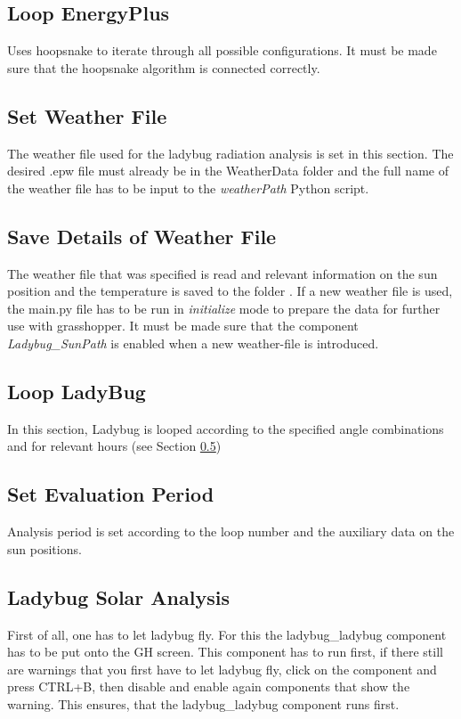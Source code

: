 	\subsection{Loop EnergyPlus}
	Uses hoopsnake to iterate through all possible configurations. It must be made sure that the hoopsnake algorithm is connected correctly.

	\subsection{Set Weather File}
	The weather file used for the ladybug radiation analysis is set in this section. The desired .epw file must already be in the WeatherData folder and the full name of the weather file has to be input to the \emph{weatherPath} Python script. 

	\subsection{Save Details of Weather File}
	The weather file that was specified is read and relevant information on the sun position and the temperature is saved to the folder . If a new weather file is used, the main.py file has to be run in \emph{initialize} mode to prepare the data for further use with grasshopper. It must be made sure that the component \emph{Ladybug\_SunPath} is enabled when a new weather-file is introduced. 


	\subsection{Loop LadyBug}
	In this section, Ladybug is looped according to the specified angle combinations and for relevant hours (see Section \ref{ss:setEvalPeriod})

	\subsection{Set Evaluation Period}
	\label{ss:setEvalPeriod}
	Analysis period is set according to the loop number and the auxiliary data on the sun positions. 

	\subsection{Ladybug Solar Analysis}
	First of all, one has to let ladybug fly. For this the ladybug\_ladybug component has to be put onto the GH screen. This component has to run first, if there still are warnings that you first have to let ladybug fly, click on the component and press CTRL+B, then disable and enable again components that show the warning. This ensures, that the ladybug\_ladybug component runs first. 

